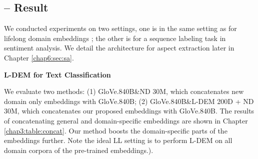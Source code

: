 \subsection{-- Result}
We conducted experiments on two settings, one is in the same setting as for lifelong domain embeddings \cite{xumeta}; the other is for a sequence labeling task in sentiment analysis. We detail the architecture for aspect extraction later in Chapter \ref{chap6:sec:sa}.

\textbf{L-DEM for Text Classification}

\begin{table}
\begin{center}
\end{center}
\label{chap3:table:concat}
\caption{Concatenating Word Embeddings}
\end{table}

We evaluate two methods: (1) GloVe.840B\&ND 30M, which concatenates new domain only embeddings with GloVe.840B; (2) GloVe.840B\&L-DEM 200D + ND 30M, which concatenates our proposed embeddings with GloVe.840B. 
The results of concatenating general and domain-specific embeddings are shown in Chapter \ref{chap3:table:concat}.
Our method boosts the domain-specific parts of the embeddings further.
Note the ideal LL setting is to perform L-DEM on all domain corpora of the pre-trained embeddings.).



